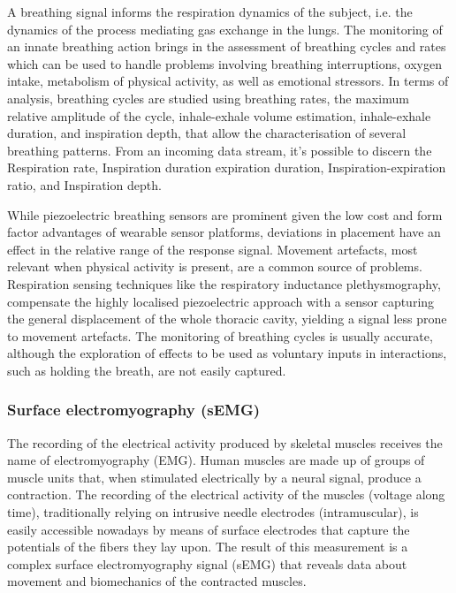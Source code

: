 A breathing signal informs the respiration dynamics of the subject, i.e. the dynamics of the process mediating gas exchange in the lungs. The monitoring of an innate breathing action brings in the assessment of breathing cycles and rates which can be used to handle problems involving breathing interruptions, oxygen intake, metabolism of physical activity, as well as emotional stressors. In terms of analysis, breathing cycles are studied using breathing rates, the maximum relative amplitude of the cycle, inhale-exhale volume estimation, inhale-exhale duration, and inspiration depth, that allow the characterisation of several breathing patterns. From an incoming data stream, it's possible to discern the Respiration rate, Inspiration duration expiration duration, Inspiration-expiration ratio, and Inspiration depth.

While piezoelectric breathing sensors are prominent given the low cost and form factor advantages of wearable sensor platforms, deviations in placement have an effect in the relative range of the response signal. Movement artefacts, most relevant when physical activity is present, are a common source of problems. Respiration sensing techniques like the respiratory inductance plethysmography, compensate the highly localised piezoelectric approach with a sensor capturing the general displacement of the whole thoracic cavity, yielding a signal less prone to movement artefacts. The monitoring of breathing cycles is usually accurate, although the exploration of effects to be used as voluntary inputs in interactions, such as holding the breath, are not easily captured.

\subsubsection{Surface electromyography (sEMG)}
The recording of the electrical activity produced by skeletal muscles receives the name of electromyography (EMG). Human muscles are made up of groups of muscle units that, when stimulated electrically by a neural signal, produce a contraction. The recording of the electrical activity of the muscles (voltage along time), traditionally relying on intrusive needle electrodes (intramuscular), is easily accessible nowadays by means of surface electrodes that capture the potentials of the fibers they lay upon. The result of this measurement is a complex surface electromyography signal (sEMG) that reveals data about movement and biomechanics of the contracted muscles.

